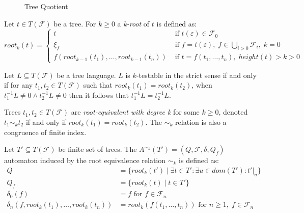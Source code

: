 \begin{figure}[H]
    \centering
    \caption{Tree Quotient}
    \label{fig_quot}
\end{figure}

\begin{defn}
Let $t \in T(\mathcal{F})$ be a tree. For $k \geq 0$ a \emph{k-root} of $t$ is defined as:
\begin{equation*}
    root_k(t) = 
    \begin{cases}
        t & \text{ if } t(\varepsilon) \in \mathcal{F}_0\\
        \xi_f & \text{ if } f = t(\varepsilon), \; f \in \bigcup_{i > 0}\mathcal{F}_i, \; k = 0\\
        f(root_{k-1}(t_1), \dots, root_{k-1}(t_n)) & \text{ if } t = f(t_1, \dots, t_n), \; height(t) > k > 0
    \end{cases}
\end{equation*}
\end{defn}

\begin{thm}
Let $L \subseteq T(\mathcal{F})$ be a tree language. $L$ is $k$-testable in the strict sense if and only if for any $t_1, t_2 \in T(\mathcal{F})$ such that $root_k(t_1) = root_k(t_2)$, when $t_1^{-1}L \neq 0 \wedge t_2^{-1}L \neq 0$ then it follows that $t_1^{-1}L = t_2^{-1}L$.
\end{thm}

\begin{defn}
Trees $t_1, t_2 \in T(\mathcal{F})$ are \emph{root-equivalent with degree k} for some $k \geq 0$, denoted $t_1 \sim_k t_2$ if and only if $root_k(t_1) = root_k(t_2)$. The $\sim_k$ relation is also a congruence of finite index.
\end{defn}

\begin{defn}
Let $T' \subseteq T(\mathcal{F})$ be finite set of trees. The $A^{\sim_k}(T') = (Q, \mathcal{F}, \delta, Q_f)$ automaton induced by the root equivalence relation $\sim_k$ is defined as:
\begin{align*}
    Q &= \{root_k(t') \; | \; \exists t \in T': \exists u \in dom(T'): t'|_u\}\\
    Q_f &= \{root_k(t) \; | \; t \in T'\}\\
    \delta_0(f) &= f \text{ for } f \in \mathcal{F}_n\\
    \delta_n(f, root_k(t_1), \dots, root_k(t_n)) &= root_k(f(t_1, \dots, t_n)) \text{ for } n \geq 1, \; f \in \mathcal{F}_n
\end{align*}
\end{defn}


